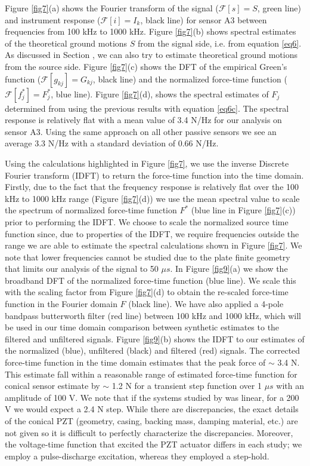 \documentclass[preprint,3p, 11pt,authoryear]{elsarticle}
\begin{document}
{Figure \ref{fig7}(a) shows the Fourier transform of the signal ($\mathcal{F}[s] = S$, green line) and instrument response ($\mathcal{F}[i] = I_{k}$, black line) for sensor A3 between frequencies from 100 kHz to 1000 kHz. Figure \ref{fig7}(b) shows spectral estimates of the theoretical ground motions $S$ from the signal side, i.e. from equation \eqref{eq6}.  As discussed in Section \label{Spec_deconv}, we can also try to estimate  theoretical ground motions from the source side.  Figure \ref{fig7}(c) shows the DFT of the empirical Green's function ($\mathcal{F}[g_{kj}] = G_{kj}$, black line) and the normalized force-time function ($\mathcal{F}[f^{*}_{j}] = F^{*}_{j}$, blue line). Figure \ref{fig7}(d), shows the spectral estimates of $F_{j}$ determined from using the previous results with equation \eqref{eq6c}.  The spectral response is relatively flat with a mean value of 3.4 N/Hz for our analysis on sensor A3.  Using the same approach on all other passive sensors we see an average 3.3 N/Hz with a standard deviation of 0.66 N/Hz. 

Using the calculations highlighted in Figure \ref{fig7}, we use the inverse Discrete Fourier transform (IDFT) to return the force-time function into the time domain. Firstly, due to the fact that the frequency response is relatively flat over the 100 kHz to 1000 kHz range (Figure \ref{fig7}(d)) we use the mean spectral value to scale the spectrum of normalized force-time function $F^{*}$ (blue line in Figure \ref{fig7}(c)) prior to performing the IDFT. We choose to scale the normalized source time function since, due to properties of the IDFT, we require frequencies outside the range we are able to estimate the spectral calculations shown in Figure \ref{fig7}.  We note that lower frequencies cannot be studied due to the plate finite geometry that limits our analysis of the signal to 50 $\mu s$.  In Figure \ref{fig9}(a) we show the broadband DFT of the normalized force-time function (blue line).  We scale this with the scaling factor from Figure \ref{fig7}(d) to obtain the re-scaled force-time function in the Fourier domain $F$ (black line). We have also applied a 4-pole bandpass butterworth filter (red line) between 100 kHz and 1000 kHz, which will be used in our time domain comparison between synthetic estimates to the filtered and unfiltered signals. Figure \ref{fig9}(b) shows the IDFT to our estimates of the normalized (blue), unfiltered (black) and filtered (red) signals.  The corrected force-time function in the time domain estimates that the peak force of $\sim$ 3.4 N. This estimate fall within a reasonable range of estimated force-time function for conical sensor estimate by \citet{Breckenridge1990} $\sim $ 1.2 N for a transient step function over 1 $\mu s$ with an amplitude of 100 V. We note that if the systems studied by \citet{Breckenridge1990} was linear, for a 200 V we would expect a 2.4 N step.  While there are discrepancies, the exact details of the conical PZT (geometry, casing, backing mass, damping material, etc.) are not given so it is difficult to perfectly characterize the discrepancies. Moreover, the voltage-time function that excited the PZT actuator differs in each study; we employ a pulse-discharge excitation, whereas they employed a step-hold.

}
\end{document}
